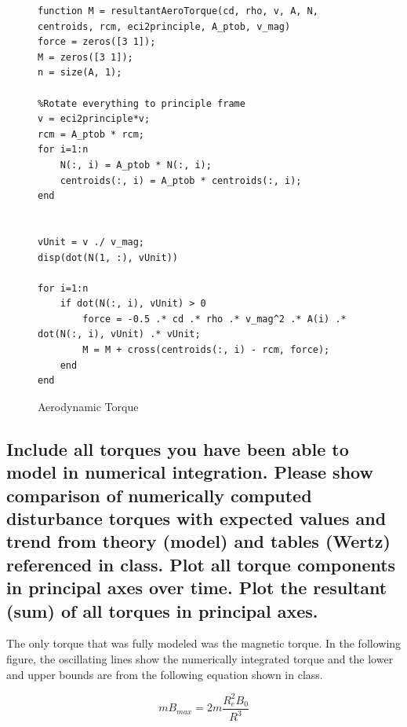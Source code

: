 \begin{figure} [H]
    \centering
    \begin{lstlisting}
function M = resultantAeroTorque(cd, rho, v, A, N, centroids, rcm, eci2principle, A_ptob, v_mag)
force = zeros([3 1]);
M = zeros([3 1]);
n = size(A, 1);

%Rotate everything to principle frame
v = eci2principle*v;
rcm = A_ptob * rcm;
for i=1:n
    N(:, i) = A_ptob * N(:, i);
    centroids(:, i) = A_ptob * centroids(:, i);
end 


vUnit = v ./ v_mag;
disp(dot(N(1, :), vUnit))

for i=1:n
    if dot(N(:, i), vUnit) > 0
        force = -0.5 .* cd .* rho .* v_mag^2 .* A(i) .* dot(N(:, i), vUnit) .* vUnit;
        M = M + cross(centroids(:, i) - rcm, force);
    end
end
    \end{lstlisting}
    \caption{Aerodynamic Torque}
    \label{fig:aero_drag_simulink_code}
\end{figure}



\subsection{Include all torques you have been able to model in numerical integration. Please show comparison of numerically computed disturbance torques with expected values and trend from theory (model) and tables (Wertz) referenced in class. Plot all torque components in principal axes over time. Plot the resultant (sum) of all torques in principal axes.}

The only torque that was fully modeled was the magnetic torque. In the following figure, the oscillating lines show the numerically integrated torque and the lower and upper bounds are from the following equation shown in class.

\begin{equation}
    m B_{max} = 2 m \frac{R_e^2 B_0}{R^3}
\end{equation}

